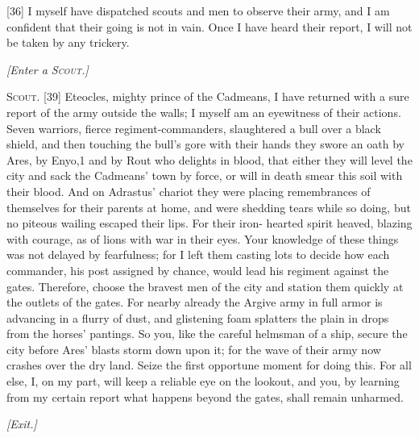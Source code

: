 \documentclass[12pt]{article}
\begin{document}
[36] I myself have dispatched scouts and men to observe their army, and I am confident that their going is not in vain. Once I have heard their report, I will not be taken by any trickery.

\begin{center}
\textit{[Enter a \textsc{Scout.}]}
\end{center}

\textsc{Scout.} [39] Eteocles, mighty prince of the Cadmeans, I have returned with a sure report of the army outside the walls; I myself am an eyewitness of their actions. Seven warriors, fierce regiment-commanders, slaughtered a bull over a black shield, and then touching the bull's gore with their hands they swore an oath by Ares, by Enyo,1 and by Rout who delights in blood, that either they will level the city and sack the Cadmeans' town by force, or will in death smear this soil with their blood. And on Adrastus' chariot they were placing remembrances of themselves for their parents at home, and were shedding tears while so doing, but no piteous wailing escaped their lips. For their iron- hearted spirit heaved, blazing with courage, as of lions with war in their eyes. Your knowledge of these things was not delayed by fearfulness; for I left them casting lots to decide how each commander, his post assigned by chance, would lead his regiment against the gates. Therefore, choose the bravest men of the city and station them quickly at the outlets of the gates. For nearby already the Argive army in full armor is advancing in a flurry of dust, and glistening foam splatters the plain in drops from the horses' pantings. So you, like the careful helmsman of a ship, secure the city before Ares' blasts storm down upon it; for the wave of their army now crashes over the dry land. Seize the first opportune moment for doing this. For all else, I, on my part, will keep a reliable eye on the lookout, and you, by learning from my certain report what happens beyond the gates, shall remain unharmed.

\begin{center}
\textit{[Exit.]}
\end{center}
\end{document}
